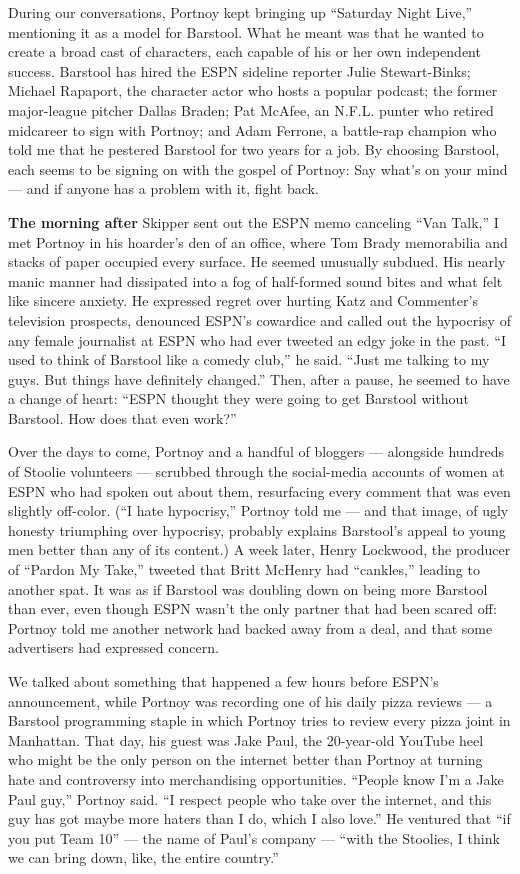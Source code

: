During our conversations, Portnoy kept bringing up ``Saturday Night
Live,'' mentioning it as a model for Barstool. What he meant was that he
wanted to create a broad cast of characters, each capable of his or her
own independent success. Barstool has hired the ESPN sideline reporter
Julie Stewart-Binks; Michael Rapaport, the character actor who hosts a
popular podcast; the former major-league pitcher Dallas Braden; Pat
McAfee, an N.F.L. punter who retired midcareer to sign with Portnoy; and
Adam Ferrone, a battle-rap champion who told me that he pestered
Barstool for two years for a job. By choosing Barstool, each seems to be
signing on with the gospel of Portnoy: Say what's on your mind --- and
if anyone has a problem with it, fight back.

\textbf{The morning after} Skipper sent out the ESPN memo canceling
``Van Talk,'' I met Portnoy in his hoarder's den of an office, where Tom
Brady memorabilia and stacks of paper occupied every surface. He seemed
unusually subdued. His nearly manic manner had dissipated into a fog of
half-formed sound bites and what felt like sincere anxiety. He expressed
regret over hurting Katz and Commenter's television prospects, denounced
ESPN's cowardice and called out the hypocrisy of any female journalist
at ESPN who had ever tweeted an edgy joke in the past. ``I used to think
of Barstool like a comedy club,'' he said. ``Just me talking to my guys.
But things have definitely changed.'' Then, after a pause, he seemed to
have a change of heart: ``ESPN thought they were going to get Barstool
without Barstool. How does that even work?''

Over the days to come, Portnoy and a handful of bloggers --- alongside
hundreds of Stoolie volunteers --- scrubbed through the social-media
accounts of women at ESPN who had spoken out about them, resurfacing
every comment that was even slightly off-color. (``I hate hypocrisy,''
Portnoy told me --- and that image, of ugly honesty triumphing over
hypocrisy, probably explains Barstool's appeal to young men better than
any of its content.) A week later, Henry Lockwood, the producer of
``Pardon My Take,'' tweeted that Britt McHenry had ``cankles,'' leading
to another spat. It was as if Barstool was doubling down on being more
Barstool than ever, even though ESPN wasn't the only partner that had
been scared off: Portnoy told me another network had backed away from a
deal, and that some advertisers had expressed concern.

We talked about something that happened a few hours before ESPN's
announcement, while Portnoy was recording one of his daily pizza reviews
--- a Barstool programming staple in which Portnoy tries to review every
pizza joint in Manhattan. That day, his guest was Jake Paul, the
20-year-old YouTube heel who might be the only person on the internet
better than Portnoy at turning hate and controversy into merchandising
opportunities. ``People know I'm a Jake Paul guy,'' Portnoy said. ``I
respect people who take over the internet, and this guy has got maybe
more haters than I do, which I also love.'' He ventured that ``if you
put Team 10'' --- the name of Paul's company --- ``with the Stoolies, I
think we can bring down, like, the entire country.''

